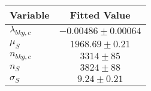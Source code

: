 \begin{tabular}[t]{lc}
\hline
Variable &Fitted Value\\
\hline\hline
$\lambda_{bkg,c}$&$-0.00486\pm0.00064$\\
\hline
$\mu_{S}$&$1968.69\pm0.21$\\
\hline
$n_{bkg,c}$&$3314\pm85$\\
\hline
$n_{S}$&$3824\pm88$\\
\hline
$\sigma_{S}$&$9.24\pm0.21$\\
\hline
\end{tabular}